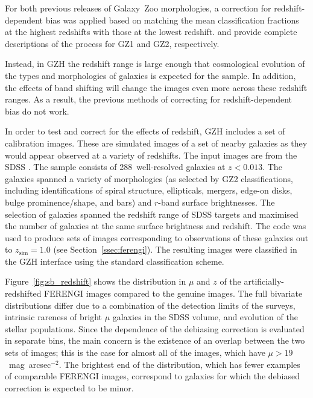 \documentclass[a4paper,fleqn,usenatbib]{mnras}
\begin{document}
For both previous releases of Galaxy~Zoo morphologies, a correction for
redshift-dependent bias was applied based on matching the mean classification
fractions at the highest redshifts with those at the lowest redshift.
\citet{bam09} and \citet{wil13} provide complete descriptions of the process
for GZ1 and GZ2, respectively.

Instead, in GZH the redshift range is large enough that cosmological evolution of the
types and morphologies of galaxies is expected for the \hst{} sample. In
addition, the effects of band shifting will change the images even more across
these redshift ranges. As a result, the previous methods of correcting for
redshift-dependent bias do not work.  

In order to test and correct for the effects of redshift, GZH includes a set of
calibration images.  These are simulated images of a set of nearby galaxies as
they would appear observed at a variety of redshifts.  The input images are
from the SDSS \citep{yor00,str02}.  The sample consists of 288~well-resolved
galaxies at $z<0.013$. The galaxies spanned a variety of morphologies (as
selected by GZ2 classifications, including identifications of spiral structure,
ellipticals, mergers, edge-on disks, bulge prominence/shape, and bars) and
$r$-band surface brightnesses.  The selection of galaxies spanned the redshift
range of SDSS targets and maximised the number of \hst{} galaxies at the same
surface brightness and redshift. The \ferengi{} code was used to produce sets
of images corresponding to observations of these galaxies out to
$z_\mathrm{sim}=1.0$ (see Section~\ref{ssec:ferengi}). The resulting images
were classified in the GZH interface using the standard classification scheme. 

Figure~\ref{fig:sb_redshift} shows the distribution in $\mu$ and $z$ of
the artificially-redshifted \textsc{FERENGI} images compared to the genuine
\hst{} images. The full bivariate distributions differ due to a combination of
the detection limits of the \hst{} surveys, intrinsic rareness of bright $\mu$
galaxies in the SDSS volume, and evolution of the stellar populations. Since
the dependence of the debiasing correction is evaluated in separate bins, the
main concern is the existence of an overlap between the two sets of images;
this is the case for almost all of the \hst{} images, which have $\mu >
19$~mag~arcsec$^{-2}$.  The brightest end of the distribution, which has fewer
examples of comparable \textsc{FERENGI} images, correspond to galaxies for
which the debiased correction is expected to be minor.
\end{document}
